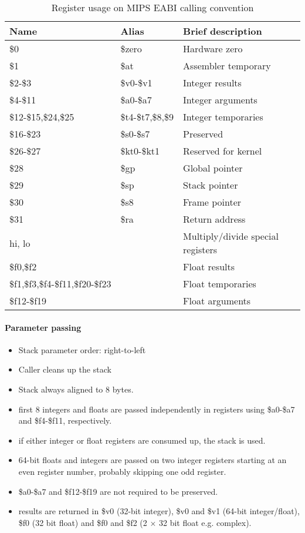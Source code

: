 \begin{table}[h]
\begin{tabular}{lll}
\hline
Name          & Alias & Brief description\\
\hline
\$0        & \$zero      & Hardware zero \\
\$1        & \$at        & Assembler temporary \\
\$2-\$3    & \$v0-\$v1   & Integer results \\
\$4-\$11   & \$a0-\$a7   & Integer arguments\\
\$12-\$15,\$24,\$25  & \$t4-\$t7,\$8,\$9   & Integer temporaries \\
\$16-\$23   & \$s0-\$s7   & Preserved \\
\$26-\$27   & \$kt0-\$kt1 & Reserved for kernel \\
\$28       & \$gp       & Global pointer \\
\$29       & \$sp       & Stack pointer \\
\$30       & \$s8       & Frame pointer \\
\$31       & \$ra       & Return address \\
hi, lo    &           & Multiply/divide special registers \\
\$f0,\$f2   &           & Float results \\
\$f1,\$f3,\$f4-\$f11,\$f20-\$f23   &           & Float temporaries \\
\$f12-\$f19 &           & Float arguments\\
\end{tabular}
\caption{Register usage on MIPS EABI calling convention}
\end{table}

\paragraph{Parameter passing}

\begin{itemize}
\item Stack parameter order: right-to-left
\item Caller cleans up the stack
\item Stack always aligned to 8 bytes.
\item first 8 integers and floats are passed independently in registers using \$a0-\$a7 and \$f4-\$f11, respectively.
\item if either integer or float registers are consumed up, the stack is used.
\item 64-bit floats and integers are passed on two integer registers starting at an even register number, probably skipping one odd register.
\item \$a0-\$a7 and \$f12-\$f19 are not required to be preserved.
\item results are returned in \$v0 (32-bit integer), \$v0 and \$v1 (64-bit integer/float), \$f0 (32 bit float) and \$f0 and \$f2 (2 $\times$ 32 bit float e.g. complex).
\end{itemize}

